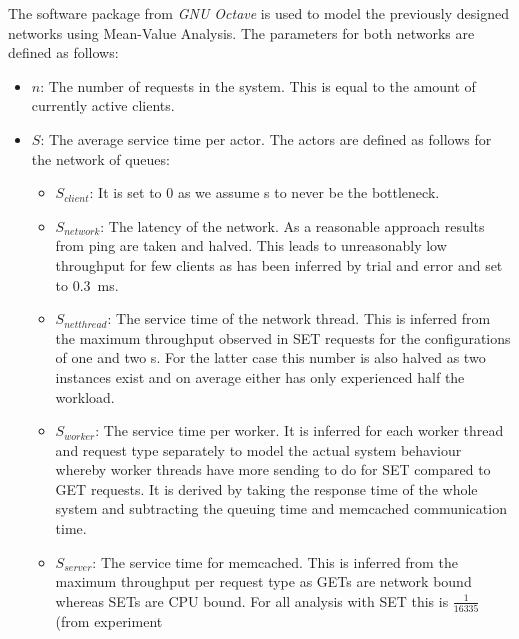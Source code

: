             The software package  from \emph{GNU Octave} is used to model the previously designed networks
            using Mean-Value Analysis. The parameters for both networks are defined as follows:
            \begin{itemize}
                \item $n$: The number of requests in the system. This is equal to the amount of currently active
                      clients.
                \item $S$: The average service time per actor. The actors are defined as follows for the network of
                      queues:
                      \begin{itemize}
                          \item $S_{client}$: It is set to 0 as we assume \cli{}s to never be the bottleneck.
                          \item $S_{network}$: The latency of the network. As a reasonable approach results from ping
                                are taken and halved. This leads to unreasonably low throughput for few clients as has
                                been inferred by trial and error and set to \SI{0.3}{\milli\second}.
                          \item $S_{netthread}$: The service time of the network thread. This is inferred from the
                                maximum throughput observed in SET requests for the configurations of one and two
                                \mw{}s. For the latter case this number is also halved as two instances exist and on
                                average either has only experienced half the workload.
                          \item $S_{worker}$: The service time per worker. It is inferred for each worker thread and
                                request type separately to model the actual system behaviour whereby worker threads have
                                more sending to do for SET compared to GET requests. It is derived by taking the
                                response time of the whole system and subtracting the queuing time and memcached
                                communication time.
                          \item $S_{server}$: The service time for memcached. This is inferred from the maximum
                                throughput per request type as GETs are network bound whereas SETs are CPU bound. For
                                all analysis with SET this is $\tfrac{1}{16335}$ (from experiment

\end{itemize}
\end{itemize}
